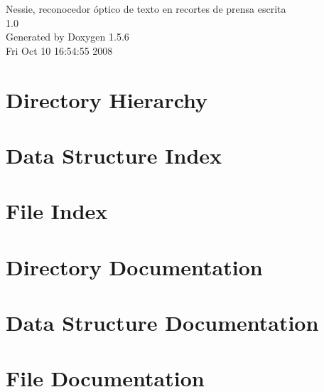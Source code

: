 \documentclass[a4paper]{book}
\begin{document}
\begin{titlepage}
\vspace*{7cm}
\begin{center}
{\Large Nessie, reconocedor óptico de texto en recortes de prensa escrita \\[1ex]\large 1.0 }\\
\vspace*{1cm}
{\large Generated by Doxygen 1.5.6}\\
\vspace*{0.5cm}
{\small Fri Oct 10 16:54:55 2008}\\
\end{center}
\end{titlepage}
\clearemptydoublepage
{}
\tableofcontents
\clearemptydoublepage
{}
\chapter{Directory Hierarchy}

\chapter{Data Structure Index}

\chapter{File Index}

\chapter{Directory Documentation}


\chapter{Data Structure Documentation}







\chapter{File Documentation}















\printindex
\end{document}
